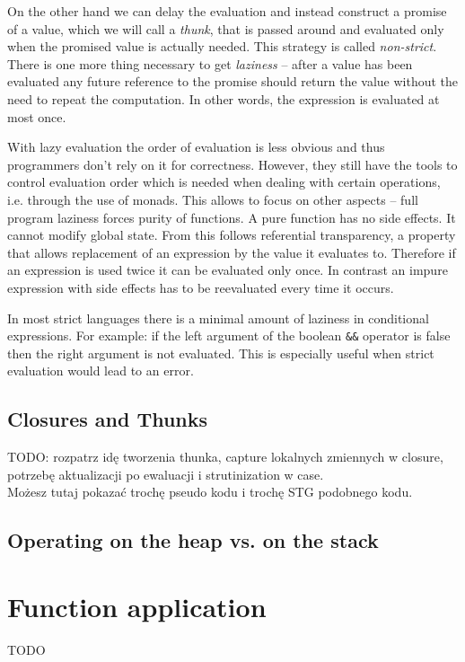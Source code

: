 \documentclass[en]{pracamgr}
\begin{document}
On the other hand we can delay the evaluation and instead construct
a promise of a value, which we will call a \textit{thunk}, that is passed around
and evaluated only when the promised value is actually needed.
This strategy is called \textit{non-strict}. There is one more thing
necessary to get \textit{laziness} -- after a value has been evaluated
any future reference to the promise should return the value without
the need to repeat the computation. In other words, the expression
is evaluated at most once.

With lazy evaluation the order of evaluation is less obvious and thus
programmers don't rely on it for correctness. However, they still have
the tools to control evaluation order which is needed when dealing with
certain operations, i.e. through the use of monads. This allows to focus
on other aspects -- full program laziness forces purity of functions.
A pure function has no side effects. It cannot modify global state.
From this follows referential transparency, a property that allows
replacement of an expression by the value it evaluates to.
Therefore if an expression is used twice it can be evaluated only once.
In contrast an impure expression with side effects has to be reevaluated
every time it occurs.

In most strict languages there is a minimal amount of laziness
in conditional expressions. For example: if the left argument of the
boolean \texttt{\&\&} operator is false then the right argument is not
evaluated. This is especially useful when strict evaluation would lead
to an error.

\section{Closures and Thunks}
TODO: rozpatrz idę tworzenia thunka, capture lokalnych zmiennych w closure,
potrzebę aktualizacji po ewaluacji i strutinization w case. \\
Możesz tutaj pokazać trochę pseudo kodu i trochę STG podobnego kodu.

\section{Operating on the heap vs. on the stack}

\chapter{Function application}\label{r:funApp}
TODO
\end{document}
